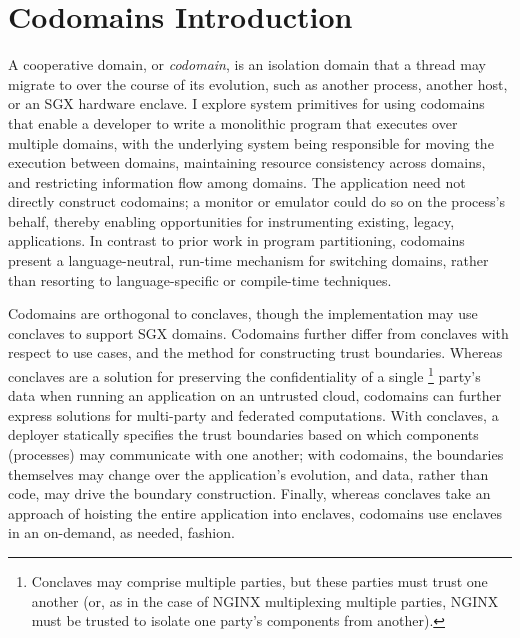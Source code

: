 \section{Codomains Introduction}
\label{sec:codomains-intro}

A cooperative domain, or \emph{codomain}, is an isolation domain
that a thread may migrate to over the course of its evolution, such as another
process, another host, or an SGX hardware enclave.
%
I explore system primitives for using codomains that enable a developer to
write a monolithic program that executes over multiple domains, with the
underlying system being responsible for moving the execution between domains,
maintaining resource consistency across domains, and restricting
information flow among domains.
%
The application need not directly construct codomains; a monitor or emulator
could do so on the process's behalf, thereby enabling opportunities for
instrumenting existing, legacy, applications.
%
In contrast to prior work in program partitioning, codomains present
a language-neutral, run-time mechanism for switching domains, rather than
resorting to language-specific or compile-time techniques.


%
Codomains are orthogonal to conclaves, though the implementation may
use conclaves to support SGX domains.
%
Codomains further differ from conclaves with respect to use cases, and the
method for constructing trust boundaries.
%
Whereas conclaves are a solution for preserving the confidentiality of a single
\footnote{
Conclaves may comprise
multiple parties, but these parties must trust one another (or, as in
the case of NGINX multiplexing multiple parties, NGINX must be trusted
to isolate one party's components from another).
}
party's data when running an application on an untrusted cloud,
%
codomains can further express solutions for multi-party and
federated computations.
%
With conclaves, a deployer statically specifies the trust boundaries based on
which components (processes) may communicate with one another;
%
%
with codomains, the boundaries themselves may change over
the application's evolution, and data, rather than code, may drive the boundary
construction.
%
Finally, whereas conclaves take an approach of hoisting the entire application
into enclaves, codomains use enclaves in an on-demand, as needed, fashion.
